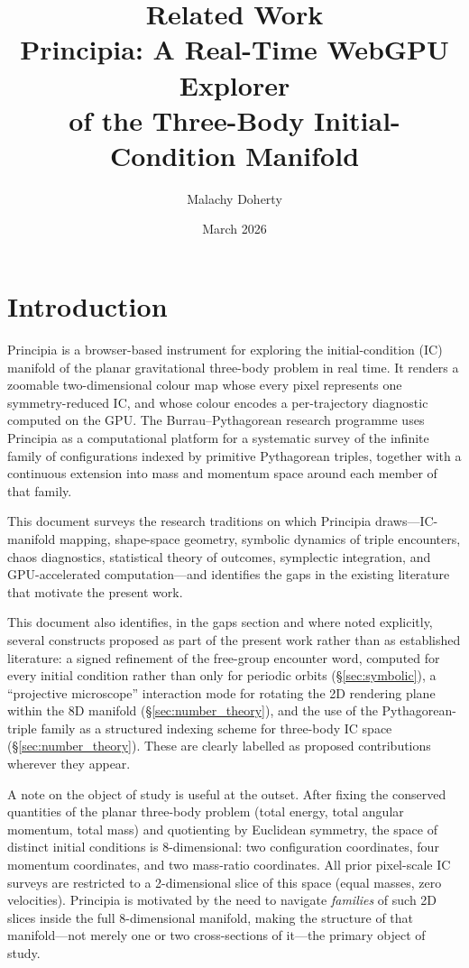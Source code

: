 \documentclass[11pt,a4paper]{article}
\title{\textbf{Related Work}\\[0.8ex]
\large Principia: A Real-Time WebGPU Explorer\\
of the Three-Body Initial-Condition Manifold}
\author{Malachy Doherty}
\date{March 2026}
\begin{document}
\maketitle
\tableofcontents
\vspace{1em}

\section{Introduction}

Principia is a browser-based instrument for exploring the initial-condition (IC) manifold of
the planar gravitational three-body problem in real time.  It renders a zoomable
two-dimensional colour map whose every pixel represents one symmetry-reduced IC, and whose
colour encodes a per-trajectory diagnostic computed on the GPU.  The Burrau--Pythagorean
research programme uses Principia as a computational platform for a systematic survey of the
infinite family of configurations indexed by primitive Pythagorean triples, together with a
continuous extension into mass and momentum space around each member of that family.

This document surveys the research traditions on which Principia draws---IC-manifold mapping,
shape-space geometry, symbolic dynamics of triple encounters, chaos diagnostics, statistical
theory of outcomes, symplectic integration, and GPU-accelerated computation---and identifies
the gaps in the existing literature that motivate the present work.

This document also identifies, in the gaps section and where noted explicitly, several
constructs proposed as part of the present work rather than as established literature: a
signed refinement of the free-group encounter word, computed for every initial condition
rather than only for periodic orbits (\S\ref{sec:symbolic}), a ``projective
microscope'' interaction mode for rotating the 2D rendering plane within the 8D manifold
(\S\ref{sec:number_theory}), and the use of the Pythagorean-triple family as a structured
indexing scheme for three-body IC space (\S\ref{sec:number_theory}).  These are clearly
labelled as proposed contributions wherever they appear.

A note on the object of study is useful at the outset.  After fixing the conserved quantities
of the planar three-body problem (total energy, total angular momentum, total mass) and quotienting
by Euclidean symmetry, the space of distinct initial conditions is 8-dimensional: two configuration
coordinates, four momentum coordinates, and two mass-ratio coordinates.  All prior pixel-scale IC
surveys are restricted to a 2-dimensional slice of this space (equal masses, zero velocities).
Principia is motivated by the need to navigate \emph{families} of such 2D slices inside the full
8-dimensional manifold, making the structure of that manifold---not merely one or two cross-sections
of it---the primary object of study.
\end{document}
